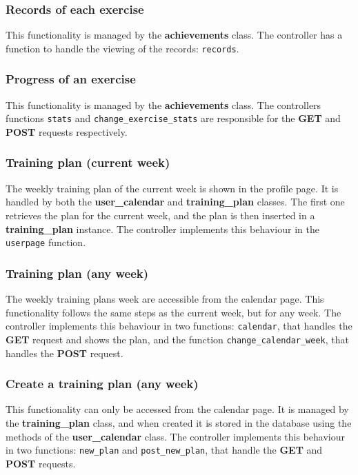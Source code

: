 \documentclass[12pt,twoside,titlepage,a4paper]{article}
\theoremstyle{definicion}
\theoremstyle{lema}
\theoremstyle{teorema}
\theoremstyle{corolario}
\theoremstyle{ejemplo}
\theoremstyle{nota}
\begin{document}
\subsubsection{Records of each exercise}

This functionality is managed by the \textbf{achievements} class. The controller has a function to handle the viewing of the records:
\texttt{records}.

\subsubsection{Progress of an exercise}

This functionality is managed by the \textbf{achievements} class. The controllers functions \texttt{stats} and 
\texttt{change\_exercise\_stats} are responsible for the \textbf{GET} and \textbf{POST} requests respectively.

\subsubsection{Training plan (current week)}

The weekly training plan of the current week is shown in the profile page. It is handled by both the 
\textbf{user\_calendar} and \textbf{training\_plan} classes. The first one retrieves the plan for the current week,
and the plan is then inserted in a \textbf{training\_plan} instance. The controller implements this behaviour in the 
\texttt{userpage} function.

\subsubsection{Training plan (any week)}

The weekly training plans week are accessible from the calendar page. This functionality follows the same steps as the current week, 
but for any week. The controller implements this behaviour in two functions: \texttt{calendar}, that handles the \textbf{GET} request
and shows the plan, and the function \texttt{change\_calendar\_week}, that handles the \textbf{POST} request.

\subsubsection{Create a training plan (any week)}

This functionality can only be accessed from the calendar page. It is managed by the \textbf{training\_plan} class, and when created
it is stored in the database using the methods of the \textbf{user\_calendar} class. The controller implements this behaviour in two
functions: \texttt{new\_plan} and \texttt{post\_new\_plan}, that handle the \textbf{GET} and \textbf{POST} requests.
\end{document}
